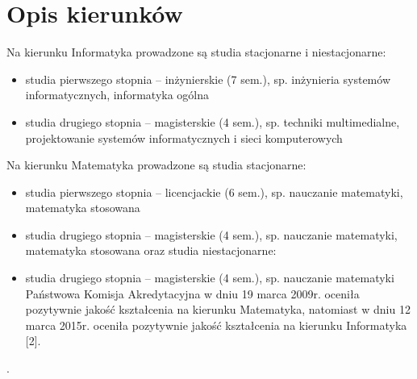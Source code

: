\documentclass[a4paper,12pt]{article}
\begin{document}
\section{Opis kierunków}

Na kierunku Informatyka prowadzone są studia stacjonarne i niestacjonarne:
\begin{itemize}
\item studia pierwszego stopnia – inżynierskie (7 sem.), sp. inżynieria systemów informatycznych, informatyka
ogólna
\item studia drugiego stopnia – magisterskie (4 sem.), sp. techniki multimedialne, projektowanie systemów
informatycznych i sieci komputerowych
\end{itemize}

Na kierunku Matematyka prowadzone są studia stacjonarne:
\begin{itemize}
\item studia pierwszego stopnia – licencjackie (6 sem.), sp. nauczanie matematyki, matematyka stosowana
\item studia drugiego stopnia – magisterskie (4 sem.), sp. nauczanie matematyki, matematyka stosowana
oraz studia niestacjonarne:
\item studia drugiego stopnia – magisterskie (4 sem.), sp. nauczanie matematyki
Państwowa Komisja Akredytacyjna w dniu 19 marca 2009r. oceniła pozytywnie jakość kształcenia na kierunku
Matematyka, natomiast w dniu 12 marca 2015r. oceniła pozytywnie jakość kształcenia na kierunku
Informatyka [2].

\end{itemize}
.

\section{}
\end{document}

